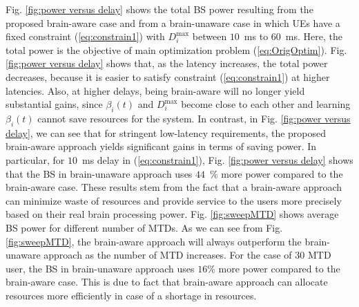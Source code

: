 \documentclass[journal,draftclsnofoot,onecolumn,12pt]{IEEEtran}%
\begin{document}
Fig. \ref{fig:power versus delay} shows the total BS power resulting from the proposed brain-aware case and from a brain-unaware case in which  UEs have a fixed constraint (\ref{eq:constrain1}) with $D_i^{\max}$ between $10$~ms to $60$~ms. Here, the total power is the objective of main optimization problem (\ref{eq:OrigOptim}). 
	Fig. \ref{fig:power versus delay} shows that, as the latency increases, the total power decreases, because it is easier to satisfy  constraint (\ref{eq:constrain1}) at higher latencies. 
	Also, at higher delays, being brain-aware will no longer yield substantial gains, since $\beta_i(t)$ and $D_i^{\max}$ become close to each other and learning $\beta_i(t)$ cannot save resources for the system. In contrast, in Fig. \ref{fig:power versus delay}, we can see that for stringent low-latency requirements, the proposed brain-aware approach yields significant gains in terms of saving power. In particular, for $10$~ms delay in (\ref{eq:constrain1}), Fig. \ref{fig:power versus delay} shows that the BS in brain-unaware approach uses $44$~\% more power compared to the brain-aware case. These results stem from the fact that a brain-aware approach can minimize waste of resources and provide service to the users more precisely based on their real brain processing power. 
	Fig. \ref{fig:sweepMTD} shows average BS power for different number of MTDs. As we can see from Fig. \ref{fig:sweepMTD}, the brain-aware approach will always outperform the brain-unaware approach as the number of MTD increases. For the case of 30 MTD user, the BS in brain-unaware approach uses $16$\% more power compared to the brain-aware case. This is due to fact that brain-aware approach can allocate resources more efficiently in case of a shortage in resources. 
	
\end{document}
